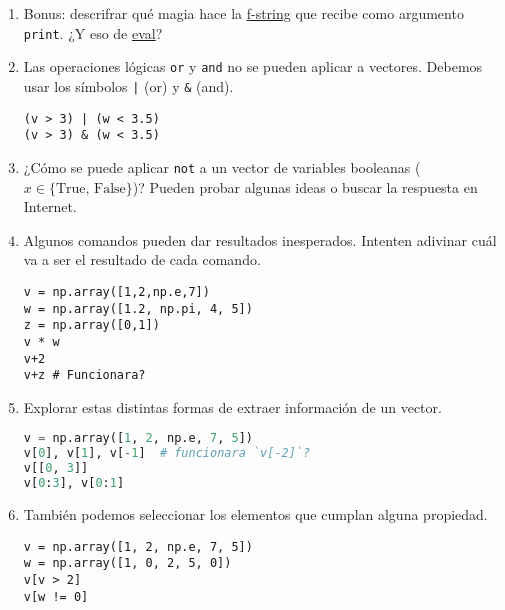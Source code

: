 \documentclass[a4paper,11pt]{article}
\theoremstyle{definition}
\begin{document}
\begin{enumerate}
Ejecutar los siguientes comandos e interpretar los resultados.

\begin{lstlisting}
np.set_printoptions(precision=2, suppress=True)
v = np.array([1,2,np.e,7])
w = np.array([1.2, np.pi, 4, 5])
for expr in [
    "v", "w", "v + w", "v ** 2", "v % 2", "np.sum(v)", "np.sqrt(w)", "v > 3", "w < 3.5"
]:
    print(f"{expr:11s} == {eval(expr)}")
\end{lstlisting}

\item Bonus: descrifrar qué magia hace la
\href{https://docs.python.org/es/3.11/tutorial/inputoutput.html\#tut-f-strings}{f-string} que recibe como argumento \lstinline{print}. ¿Y eso de \href{https://docs.python.org/es/3.11/library/functions.html\#eval}{eval}?

\item Las operaciones lógicas \lstinline{or} y \lstinline{and} no se pueden aplicar a vectores. Debemos usar los símbolos \lstinline{|} (or) y \lstinline{&} (and).
\begin{lstlisting}
(v > 3) | (w < 3.5)
(v > 3) & (w < 3.5)
\end{lstlisting}

\item ¿Cómo se puede aplicar \lstinline{not} a un vector de variables booleanas ($x \in \{\text{True, False}\}$)? Pueden probar algunas ideas o buscar la respuesta en Internet.

\item Algunos comandos pueden dar resultados inesperados. Intenten adivinar cuál va a ser el resultado de cada comando.
\begin{lstlisting}
v = np.array([1,2,np.e,7])
w = np.array([1.2, np.pi, 4, 5])
z = np.array([0,1])
v * w
v+2
v+z # Funcionara?
\end{lstlisting}

\item Explorar estas distintas formas de extraer información de un vector.
\begin{lstlisting}[language=Python]
v = np.array([1, 2, np.e, 7, 5])
v[0], v[1], v[-1]  # funcionara `v[-2]`?
v[[0, 3]]
v[0:3], v[0:1]
\end{lstlisting}

\item También podemos seleccionar los elementos que cumplan alguna propiedad.
\begin{lstlisting}
v = np.array([1, 2, np.e, 7, 5])
w = np.array([1, 0, 2, 5, 0])
v[v > 2]
v[w != 0]
\end{lstlisting}


\end{enumerate}
\end{document}
